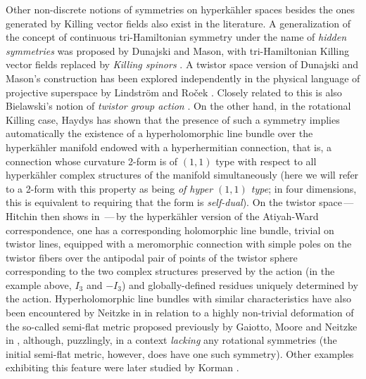 \documentclass[11pt]{amsart}
\theoremstyle{remark}
\theoremstyle{remark}
\theoremstyle{definition}
\theoremstyle{definition}
\theoremstyle{definition}
\newcommand{\0}{{\scriptstyle 0'}} %
\newcommand{\1}{{\scriptstyle 1'}}
\begin{document}

Other non-discrete notions of symmetries on hyperk\"ahler spaces besides the ones generated by Killing vector fields also exist in the literature. A generalization of the concept of continuous tri-Hamiltonian symmetry under the name of \textit{hidden symmetries} was proposed by Dunajski and Mason, with tri-Hamiltonian Killing vector fields replaced by \textit{Killing spinors} \cite{MR1785432, MR2006758}. A twistor space version of Dunajski and Mason's construction has been explored independently in the physical language of projective superspace by Lindstr\"om and Ro\v{c}ek \cite{MR929144, Lindstrom:2008gs}. Closely related to this is also Bielawski's notion of \textit{twistor group action} \cite{MR1848654}. On the other hand, in the rotational Killing case, Haydys \cite{MR2394039} has shown that the presence of such a symmetry implies automatically the existence of a hyperholomorphic line bundle over the hyperk\"ahler manifold endowed with a hyperhermitian connection, that is, a connection whose curvature 2-form is of \mbox{$(1,1)$} type with respect to all hyperk\"ahler complex structures of the manifold simultaneously (here we will refer to a 2-form with this property as being \textit{of hyper \mbox{$(1,1)$} type}; in four dimensions, this is equivalent to requiring that the form is \textit{self-dual}). On the twistor space\,---\,Hitchin then shows in \cite{MR3116317}\,---\,by the hyperk\"ahler version of the Atiyah-Ward correspondence, one has a corresponding holomorphic line bundle, trivial on twistor lines, equipped with a meromorphic connection with simple poles on the twistor fibers over 
the antipodal pair of points of the twistor sphere corresponding to the two complex structures preserved by the action (in the example above, $I_3$ and $-I_3$) 
and globally-defined residues uniquely determined by the action. Hyperholomorphic line bundles with similar characteristics have also been encountered by Neitzke in \cite{Neitzke:2011za} in relation to a highly non-trivial deformation of the so-called semi-flat metric proposed previously by Gaiotto, Moore and Neitzke in \cite{MR2672801}, although, puzzlingly, in a context \textit{lacking} any rotational symmetries (the initial semi-flat metric, however, does have one such symmetry). Other examples exhibiting this feature were later studied by Korman \cite{MR3625762}. 
\end{document}
